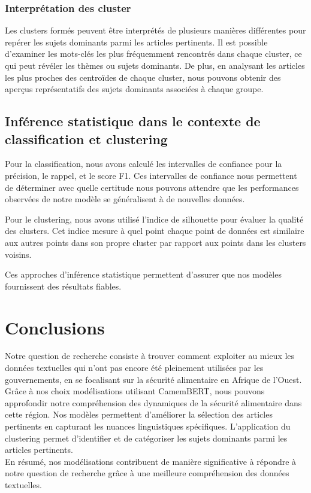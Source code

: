 \documentclass{article}
\begin{document}
\subsubsection{Interprétation des cluster}
Les clusters formés peuvent être interprétés de plusieurs manières différentes pour repérer les sujets dominants parmi les articles pertinents. Il est possible d'examiner les mots-clés les plus fréquemment rencontrés dans chaque cluster, ce qui peut révéler les thèmes ou sujets dominants. De plus, en analysant les articles les plus proches des centroïdes de chaque cluster, nous pouvons obtenir des aperçus représentatifs des sujets dominants associées à chaque groupe.

\subsection{Inférence statistique dans le contexte de classification et clustering}
Pour la classification, nous avons calculé les intervalles de confiance pour la précision, le rappel, et le score F1. Ces intervalles de confiance nous permettent de déterminer avec quelle certitude nous pouvons attendre que les performances observées de notre modèle se généralisent à de nouvelles données. 

Pour le clustering, nous avons utilisé l'indice de silhouette pour évaluer la qualité des clusters. Cet indice mesure à quel point chaque point de données est similaire aux autres points dans son propre cluster par rapport aux points dans les clusters voisins. 

Ces approches d'inférence statistique permettent d'assurer que nos modèles fournissent des résultats fiables.

\section{Conclusions}
Notre question de recherche consiste à trouver comment exploiter au mieux les données textuelles qui n'ont pas encore été pleinement utilisées par les gouvernements, en se focalisant sur la sécurité alimentaire en Afrique de l'Ouest.\\

Grâce à nos choix modélisations utilisant CamemBERT, nous pouvons approfondir notre compréhension des dynamiques de la sécurité alimentaire dans cette région. Nos modèles permettent d'améliorer la sélection des articles pertinents en capturant les nuances linguistiques spécifiques. L'application du clustering permet d'identifier et de catégoriser les sujets dominants parmi les articles pertinents. \\

En résumé, nos modélisations contribuent de manière significative à répondre à notre question de recherche grâce à une meilleure compréhension des données textuelles.



\end{document}
